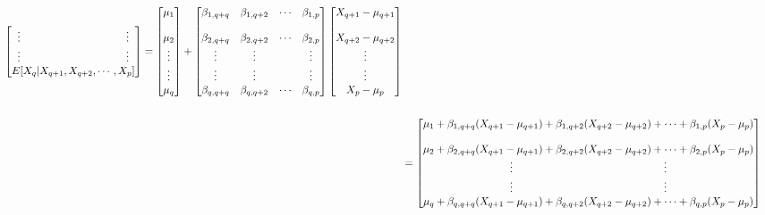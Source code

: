 \documentclass[
]{book}
\theoremstyle{definition}
\theoremstyle{definition}
\theoremstyle{definition}
\theoremstyle{definition}
\theoremstyle{remark}
\begin{document}
\begin{itemize}
\begin{align*}
\begin{bmatrix}
  \vdots  \hspace{3.5cm} \vdots    \\
  \vdots  \hspace{3.5cm} \vdots    \\
  E[X_q | X_{q+1},X_{q+2},\cdots, X_{p}]
  \end{bmatrix}=\begin{bmatrix}
  \mu_1 \\ \\ \mu_2 \\ \vdots \\ \vdots \\ \mu_q
  \end{bmatrix}+\begin{bmatrix}
  \beta_{1,q+q} & \beta_{1,q+2} & \cdots &\beta_{1,p}\\ \\
  \beta_{2,q+q} & \beta_{2,q+2} & \cdots &\beta_{2,p}\\
  \vdots & \vdots &  & \vdots \\
  \vdots & \vdots &  & \vdots \\
  \beta_{q,q+q} & \beta_{q,q+2} & \cdots &\beta_{q,p}\\
  \end{bmatrix}\begin{bmatrix}
  X_{q+1}- \mu_{q+1}\\ \\ 
  X_{q+2}- \mu_{q+2}\\
  \vdots \\ \vdots \\ 
  X_{p}- \mu_{p}\\
  \end{bmatrix}\\ \\
  &= \begin{bmatrix}
  \mu_1+\beta_{1,q+q}(X_{q+1}- \mu_{q+1}) + \beta_{1,q+2}(X_{q+2}- \mu_{q+2}) + \cdots +\beta_{1,p}(X_{p}- \mu_{p})\\ \\
  \mu_2+\beta_{2,q+q}(X_{q+1}- \mu_{q+1}) + \beta_{2,q+2}(X_{q+2}- \mu_{q+2}) + \cdots +\beta_{2,p}(X_{p}- \mu_{p})\\
  \vdots  \hspace{5.0cm}   \vdots \\
  \vdots \hspace{5.0cm}    \vdots \\
  \mu_q+\beta_{q,q+q}(X_{q+1}- \mu_{q+1}) + \beta_{q,q+2}(X_{q+2}- \mu_{q+2}) + \cdots +\beta_{q,p}(X_{p}- \mu_{p})\\
  \end{bmatrix}
  \end{align*}
\end{itemize}
\end{document}
